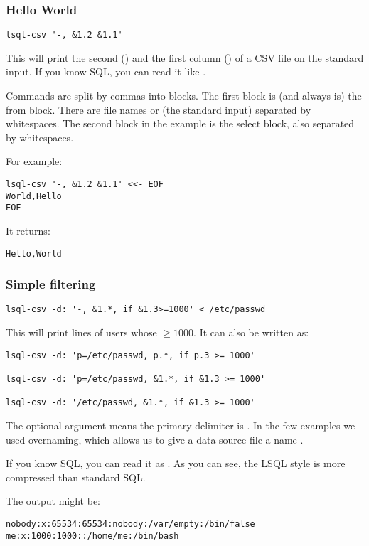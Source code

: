 \subsubsection{Hello World}
\begin{verbatim}
lsql-csv '-, &1.2 &1.1'
\end{verbatim}
This will print the second () and the first column () of a CSV file on the standard input. If you know SQL, you can read it like .

Commands are split by commas into blocks. The first block is (and always is) the from block. There are file names or \icode{-} (the standard input) separated by whitespaces. The second block in the example is the select block, also separated by whitespaces.

For example:
\begin{verbatim}
lsql-csv '-, &1.2 &1.1' <<- EOF
World,Hello
EOF
\end{verbatim}
It returns:
\begin{verbatim}
Hello,World
\end{verbatim}


\subsubsection{Simple filtering}

\begin{verbatim}
lsql-csv -d: '-, &1.*, if &1.3>=1000' < /etc/passwd
\end{verbatim}
This will print lines of users whose  $\geq 1000$. It can also be written as:
\begin{verbatim}
lsql-csv -d: 'p=/etc/passwd, p.*, if p.3 >= 1000'
    
lsql-csv -d: 'p=/etc/passwd, &1.*, if &1.3 >= 1000'

lsql-csv -d: '/etc/passwd, &1.*, if &1.3 >= 1000'
\end{verbatim}
The  optional argument means the primary delimiter is \icode{:}. In the few examples we used overnaming, which allows us to give a data source file  a name .

If you know SQL, you can read it as . As you can see, the LSQL style is more compressed than standard SQL.

The output might be:
\begin{verbatim}
nobody:x:65534:65534:nobody:/var/empty:/bin/false
me:x:1000:1000::/home/me:/bin/bash
\end{verbatim}

